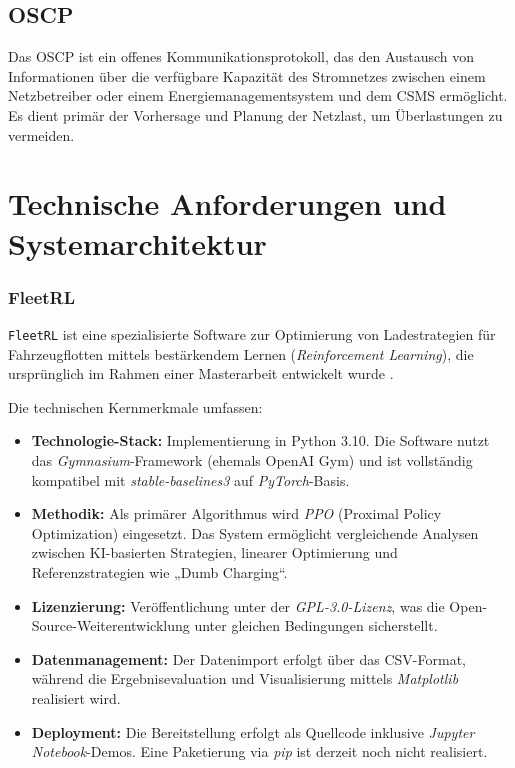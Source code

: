 \documentclass[12pt,a4paper]{report}
\begin{document}
    \subsection{ \texorpdfstring{\gls{OSCP}}{OSCP} }
    Das \gls{OSCP} ist ein offenes Kommunikationsprotokoll, 
    das den Austausch von Informationen über die verfügbare Kapazität des Stromnetzes 
    zwischen einem Netzbetreiber oder einem Energiemanagementsystem
    und dem \gls{CSMS} ermöglicht. 
    Es dient primär der Vorhersage und Planung der Netzlast, um Überlastungen zu vermeiden.
    


\section{Technische Anforderungen und Systemarchitektur}

\subsubsection{\texorpdfstring{\gls{FleetRL}}{FleetRL}}
\texttt{FleetRL} ist eine spezialisierte Software zur Optimierung von Ladestrategien für Fahrzeugflotten mittels bestärkendem Lernen (\textit{Reinforcement Learning}), die ursprünglich im Rahmen einer Masterarbeit entwickelt wurde \cite{FleetRL}.

Die technischen Kernmerkmale umfassen:
\begin{itemize}
    \item \textbf{Technologie-Stack:} Implementierung in Python 3.10. Die Software nutzt das \textit{Gymnasium}-Framework (ehemals OpenAI Gym) und ist vollständig kompatibel mit \textit{stable-baselines3} auf \textit{PyTorch}-Basis.
    \item \textbf{Methodik:} Als primärer Algorithmus wird \textit{PPO} (Proximal Policy Optimization) eingesetzt. Das System ermöglicht vergleichende Analysen zwischen KI-basierten Strategien, linearer Optimierung und Referenzstrategien wie „Dumb Charging“.
    \item \textbf{Lizenzierung:} Veröffentlichung unter der \textit{GPL-3.0-Lizenz}, was die Open-Source-Weiterentwicklung unter gleichen Bedingungen sicherstellt.
    \item \textbf{Datenmanagement:} Der Datenimport erfolgt über das CSV-Format, während die Ergebnisevaluation und Visualisierung mittels \textit{Matplotlib} realisiert wird.
    \item \textbf{Deployment:} Die Bereitstellung erfolgt als Quellcode inklusive \textit{Jupyter Notebook}-Demos. Eine Paketierung via \textit{pip} ist derzeit noch nicht realisiert.
\end{itemize}
\end{document}
